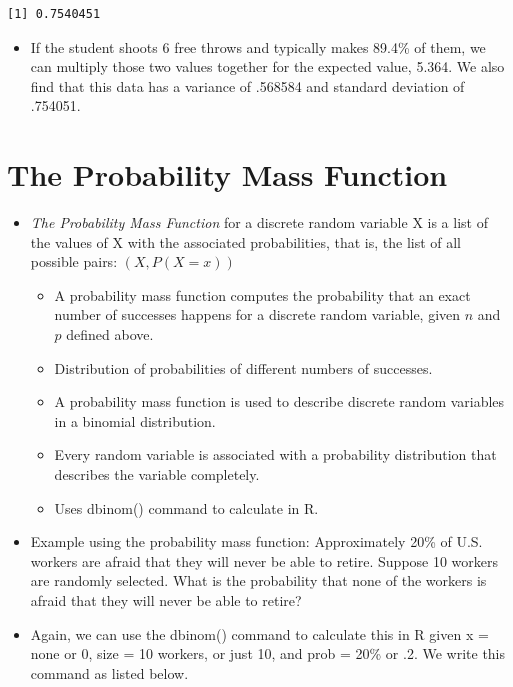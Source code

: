 \documentclass[
  letterpaper,
  DIV=11,
  numbers=noendperiod]{scrreprt}
\providecommand{\tightlist}{%
  \setlength{\itemsep}{0pt}\setlength{\parskip}{0pt}}\usepackage{longtable,booktabs,array}
\begin{document}
\begin{verbatim}
[1] 0.7540451
\end{verbatim}

\begin{itemize}
\tightlist
\item
  If the student shoots 6 free throws and typically makes 89.4\% of
  them, we can multiply those two values together for the expected
  value, 5.364. We also find that this data has a variance of .568584
  and standard deviation of .754051.
\end{itemize}

\section{The Probability Mass
Function}\label{the-probability-mass-function}

\begin{itemize}
\tightlist
\item
  \emph{The Probability Mass Function} for a discrete random variable X
  is a list of the values of X with the associated probabilities, that
  is, the list of all possible pairs: \((X, P(X=x))\)

  \begin{itemize}
  \tightlist
  \item
    A probability mass function computes the probability that an exact
    number of successes happens for a discrete random variable, given
    \(n\) and \(p\) defined above.
  \item
    Distribution of probabilities of different numbers of successes.
  \item
    A probability mass function is used to describe discrete random
    variables in a binomial distribution.
  \item
    Every random variable is associated with a probability distribution
    that describes the variable completely.
  \item
    Uses dbinom() command to calculate in R.
  \end{itemize}
\item
  Example using the probability mass function: Approximately 20\% of
  U.S. workers are afraid that they will never be able to retire.
  Suppose 10 workers are randomly selected. What is the probability that
  none of the workers is afraid that they will never be able to retire?
\item
  Again, we can use the dbinom() command to calculate this in R given x
  = none or 0, size = 10 workers, or just 10, and prob = 20\% or .2. We
  write this command as listed below.
\end{itemize}
\end{document}

